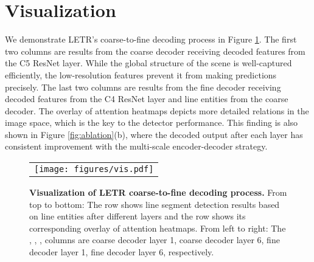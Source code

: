 \documentclass[final]{cvpr}
\begin{document}
\begin{table}[h]
    \centering
    \vspace{-2mm}
    \caption{\textbf{Effectiveness of pretraining.} We train LETR (coarse decoding stage only) with two variants. ImageNet represents LETR with ImageNet pretrained ResNet backbone. COCO represents LETR with COCO pretrained DETR weights.}
    \vspace{1mm}
    \vspace{-5mm}
    \label{tab:compare-pretraining}
\end{table}

\vspace{-2mm}
\section{Visualization}
\label{vis_section}
\vspace{-2mm}
We demonstrate LETR's coarse-to-fine decoding process in Figure \ref{fig:vis_coarse_to_fine}. The first two columns are results from the coarse decoder receiving decoded features from the C5 ResNet layer. While the global structure of the scene is well-captured efficiently, the low-resolution features prevent it from making predictions precisely. The last two columns are results from the fine decoder receiving decoded features from the C4 ResNet layer and line entities from the coarse decoder. The overlay of attention heatmaps depicts more detailed relations in the image space, which is the key to the detector performance. This finding is also shown in Figure \ref{fig:ablation}(b), where the decoded output after each layer has consistent improvement with the multi-scale encoder-decoder strategy. 


\begin{figure}[!htp]
\centering
\vspace{-3mm}
\begin{tabular}{c}
\texttt{[image: figures/vis.pdf]} \\
\end{tabular}
\caption{\small \textbf{Visualization of LETR coarse-to-fine decoding process.} From top to bottom: The   row shows line segment detection results based on line entities after different layers and the  row shows its corresponding overlay of attention heatmaps. From left to right: The , , ,  columns are coarse decoder layer 1, coarse decoder layer 6, fine decoder layer 1, fine decoder layer 6, respectively.} 
\label{fig:vis_coarse_to_fine}
\vspace{-3mm}
\end{figure}
\end{document}
